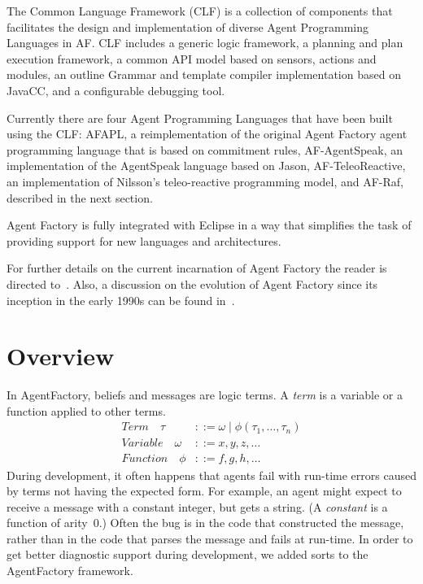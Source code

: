 \documentclass[preprint]{sigplanconf} %
\begin{document}
The Common Language Framework (CLF) is a collection of components that
facilitates the design and implementation of diverse Agent Programming
Languages in AF. CLF includes a generic logic framework, a planning and
plan execution framework, a common API model based on sensors, actions and
modules, an outline Grammar and template compiler implementation based on
JavaCC, and a configurable debugging tool.

Currently there are four Agent Programming Languages that have been built
using the CLF: AFAPL, a reimplementation of the original Agent Factory
agent programming language that is based on commitment rules,
AF-AgentSpeak, an implementation of the AgentSpeak language based on
Jason, AF-TeleoReactive, an implementation of Nilsson's teleo-reactive
programming model, and AF-Raf, described in the next section.

Agent Factory is fully integrated with Eclipse in a way that simplifies
the task of providing support for new languages and architectures.

For further details on the current incarnation of Agent Factory the reader
is directed to~\cite{collier2009modeling}. Also, a discussion on the
evolution of Agent Factory since its inception in the early 1990s can be
found in~\cite{muldoon2009towards}.

\section{Overview} %

In AgentFactory, beliefs and messages are logic terms. A \emph{term} is a
variable or a function applied to other terms.
\begin{align}
\mathit{Term}\quad\tau
  &::= \omega
  \mid \phi(\tau_1,\ldots,\tau_n) \\
\mathit{Variable}\quad\omega
  &::= x, y, z, \ldots \\
\mathit{Function}\quad\phi
  &::= f, g, h, \ldots
\end{align}
During development, it often happens that agents fail with run-time errors
caused by terms not having the expected form. For example, an agent might
expect to receive a message with a constant integer, but gets a string.  (A
\emph{constant} is a function of arity~$0$.) Often the bug is in the code
that constructed the message, rather than in the code that parses the
message and fails at run-time. In order to get better diagnostic support
during development, we added sorts to the AgentFactory framework.
\end{document}
